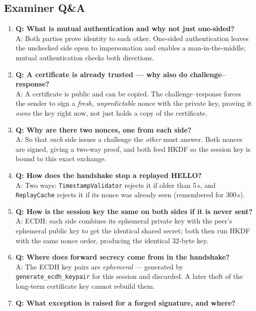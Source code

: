 \documentclass[11pt,a4paper]{article}
\begin{document}
\subsection{Examiner Q\&A}
\begin{enumerate}
  \item \textbf{Q: What is mutual authentication and why not just one-sided?}\\
        A: Both parties prove identity to each other. One-sided authentication
        leaves the unchecked side open to impersonation and enables a
        man-in-the-middle; mutual authentication checks both directions.
  \item \textbf{Q: A certificate is already trusted --- why also do
        challenge--response?}\\
        A: A certificate is public and can be copied. The challenge--response
        forces the sender to sign a \emph{fresh, unpredictable} nonce with the
        private key, proving it \emph{owns} the key right now, not just holds a
        copy of the certificate.
  \item \textbf{Q: Why are there two nonces, one from each side?}\\
        A: So that \emph{each} side issues a challenge the \emph{other} must
        answer. Both nonces are signed, giving a two-way proof, and both feed
        HKDF so the session key is bound to this exact exchange.
  \item \textbf{Q: How does the handshake stop a replayed HELLO?}\\
        A: Two ways: \texttt{TimestampValidator} rejects it if older than 5\,s,
        and \texttt{ReplayCache} rejects it if its nonce was already seen
        (remembered for 300\,s).
  \item \textbf{Q: How is the session key the same on both sides if it is never
        sent?}\\
        A: ECDH: each side combines its ephemeral private key with the peer's
        ephemeral public key to get the identical shared secret; both then run
        HKDF with the same nonce order, producing the identical 32-byte key.
  \item \textbf{Q: Where does forward secrecy come from in the handshake?}\\
        A: The ECDH key pairs are \emph{ephemeral} --- generated by
        \texttt{generate\_ecdh\_keypair} for this session and discarded.
        A later theft of the long-term certificate key cannot rebuild them.
  \item \textbf{Q: What exception is raised for a forged signature, and where?}\\

\end{enumerate}
\end{document}
